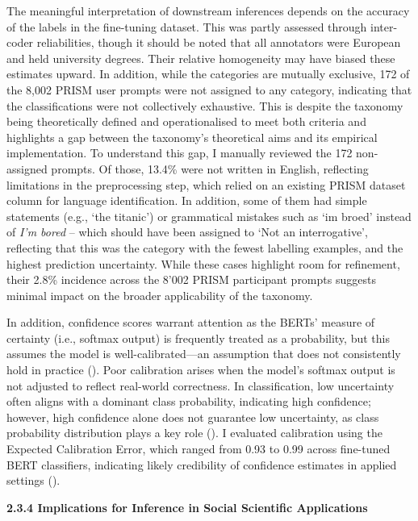 \documentclass[
  12pt,
]{article}
\begin{document}
The meaningful interpretation of downstream inferences depends on the accuracy of the labels in the fine-tuning dataset. This was partly assessed through inter-coder reliabilities, though it should be noted that all annotators were European and held university degrees. Their relative homogeneity may have biased these estimates upward. In addition, while the categories are mutually exclusive, 172 of the 8,002 PRISM user prompts were not assigned to any category, indicating that the classifications were not collectively exhaustive. This is despite the taxonomy being theoretically defined and operationalised to meet both criteria and highlights a gap between the taxonomy's theoretical aims and its empirical implementation. To understand this gap, I manually reviewed the 172 non-assigned prompts. Of those, 13.4\% were not written in English, reflecting limitations in the preprocessing step, which relied on an existing PRISM dataset column for language identification. In addition, some of them had simple statements (e.g., `the titanic') or grammatical mistakes such as `im broed' instead of \emph{I'm bored} -- which should have been assigned to `Not an interrogative', reflecting that this was the category with the fewest labelling examples, and the highest prediction uncertainty. While these cases highlight room for refinement, their 2.8\% incidence across the 8'002 PRISM participant prompts suggests minimal impact on the broader applicability of the taxonomy.

In addition, confidence scores warrant attention as the BERTs' measure of certainty (i.e., softmax output) is frequently treated as a probability, but this assumes the model is well-calibrated---an assumption that does not consistently hold in practice (). Poor calibration arises when the model's softmax output is not adjusted to reflect real-world correctness. In classification, low uncertainty often aligns with a dominant class probability, indicating high confidence; however, high confidence alone does not guarantee low uncertainty, as class probability distribution plays a key role (). I evaluated calibration using the Expected Calibration Error, which ranged from 0.93 to 0.99 across fine-tuned BERT classifiers, indicating likely credibility of confidence estimates in applied settings ().

\textbf{2.3.4 Implications for Inference in Social Scientific Applications}
\end{document}
